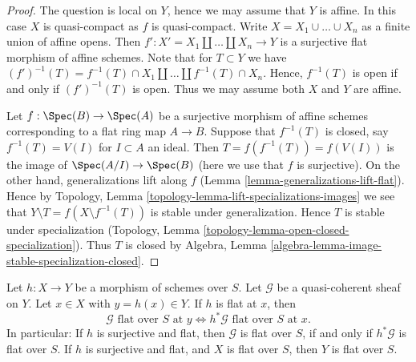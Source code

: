 \begin{proof}
The question is local on $Y$, hence we may assume that $Y$ is affine.
In this case $X$ is quasi-compact as $f$ is quasi-compact.
Write $X = X_1 \cup \ldots \cup X_n$ as a finite union of affine opens.
Then $f' : X' = X_1 \coprod \ldots \coprod X_n \to Y$ is a surjective
flat morphism of affine schemes. Note that for $T \subset Y$ we have
$(f')^{-1}(T) = f^{-1}(T) \cap X_1 \coprod \ldots \coprod f^{-1}(T) \cap X_n$.
Hence, $f^{-1}(T)$ is open if and only if $(f')^{-1}(T)$ is open.
Thus we may assume both $X$ and $Y$ are affine.

\medskip\noindent
Let $f : \Spec(B) \to \Spec(A)$ be a surjective
morphism of affine schemes corresponding to a flat ring map $A \to B$.
Suppose that $f^{-1}(T)$ is closed, say $f^{-1}(T) = V(I)$ for $I \subset A$
an ideal. Then $T = f(f^{-1}(T)) = f(V(I))$ is the image of
$\Spec(A/I) \to \Spec(B)$ (here we use that $f$
is surjective). On the other hand, generalizations lift along $f$
(Lemma \ref{lemma-generalizations-lift-flat}).
Hence by Topology, Lemma \ref{topology-lemma-lift-specializations-images}
we see that $Y \setminus T = f(X \setminus f^{-1}(T))$ is stable under
generalization. Hence $T$ is stable under specialization
(Topology, Lemma \ref{topology-lemma-open-closed-specialization}).
Thus $T$ is closed by
Algebra, Lemma \ref{algebra-lemma-image-stable-specialization-closed}.
\end{proof}

\begin{lemma}
\label{lemma-flat-permanence}
Let $h : X \to Y$ be a morphism of schemes over $S$.
Let $\mathcal{G}$ be a quasi-coherent sheaf on $Y$.
Let $x \in X$ with $y = h(x) \in Y$. If $h$ is flat at $x$, then
$$
\mathcal{G}\text{ flat over }S\text{ at }y
\Leftrightarrow
h^*\mathcal{G}\text{ flat over }S\text{ at }x.
$$
In particular: If $h$ is surjective and flat, then
$\mathcal{G}$ is flat over $S$, if and only if
$h^*\mathcal{G}$ is flat over $S$. If $h$ is surjective and
flat, and $X$ is flat over $S$, then $Y$ is flat over $S$.
\end{lemma}

